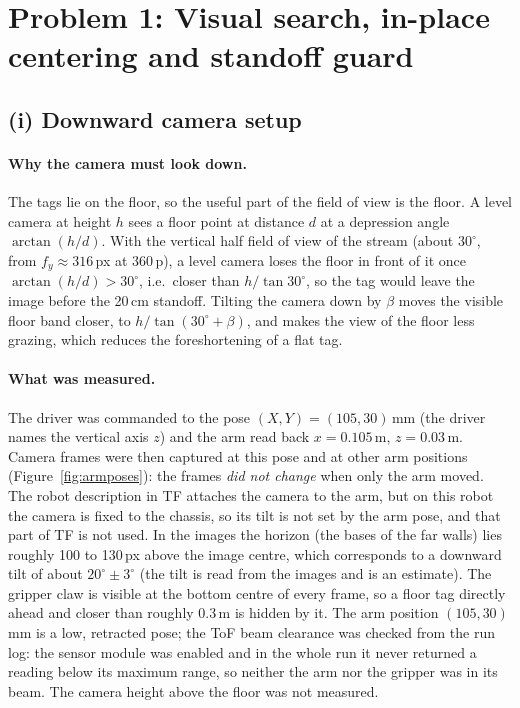 \documentclass[11pt,a4paper]{article}
\begin{document}
\section{Problem 1: Visual search, in-place centering and standoff guard}

\subsection{(i) Downward camera setup}
\paragraph{Why the camera must look down.} The tags lie on the floor, so the useful part of the field of view is the floor. A level camera at height $h$ sees a floor point at distance $d$ at a depression angle $\arctan(h/d)$. With the vertical half field of view of the stream (about $30^\circ$, from $f_y\approx316$\,px at $360$\,p), a level camera loses the floor in front of it once $\arctan(h/d)>30^\circ$, i.e.\ closer than $h/\tan30^\circ$, so the tag would leave the image before the 20\,cm standoff. Tilting the camera down by $\beta$ moves the visible floor band closer, to $h/\tan(30^\circ+\beta)$, and makes the view of the floor less grazing, which reduces the foreshortening of a flat tag.

\paragraph{What was measured.} The driver was commanded to the pose $(X,Y)=(105,30)$\,mm (the driver names the vertical axis $z$) and the arm read back $x=0.105$\,m, $z=0.03$\,m. Camera frames were then captured at this pose and at other arm positions (Figure~\ref{fig:armposes}): the frames \emph{did not change} when only the arm moved. The robot description in TF attaches the camera to the arm, but on this robot the camera is fixed to the chassis, so its tilt is not set by the arm pose, and that part of TF is not used. In the images the horizon (the bases of the far walls) lies roughly 100 to 130\,px above the image centre, which corresponds to a downward tilt of about $20^\circ\pm3^\circ$ (the tilt is read from the images and is an estimate). The gripper claw is visible at the bottom centre of every frame, so a floor tag directly ahead and closer than roughly 0.3\,m is hidden by it. The arm position $(105,30)$\,mm is a low, retracted pose; the ToF beam clearance was checked from the run log: the sensor module was enabled and in the whole run it never returned a reading below its maximum range, so neither the arm nor the gripper was in its beam. The camera height above the floor was not measured.
\end{document}
